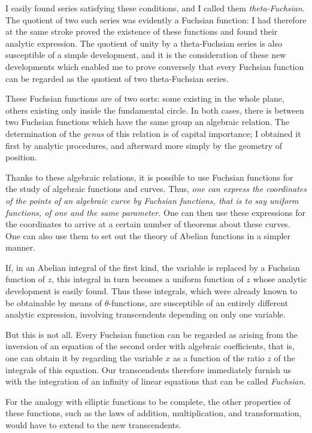 \documentclass[11pt]{article}
\begin{document}
I easily found series satisfying these conditions, and I called them \emph{theta-Fuchsian}. The quotient of two such series was evidently a Fuchsian function: I had therefore at the same stroke proved the existence of these functions and found their analytic expression. The quotient of unity by a theta-Fuchsian series is also susceptible of a simple development, and it is the consideration of these new developments which enabled me to prove conversely that every Fuchsian function can be regarded as the quotient of two theta-Fuchsian series.

These Fuchsian functions are of two sorts: some existing in the whole plane, others existing only inside the fundamental circle. In both cases, there is between two Fuchsian functions which have the same group an algebraic relation. The determination of the \emph{genus} of this relation is of capital importance; I obtained it first by analytic procedures, and afterward more simply by the geometry of position.

Thanks to these algebraic relations, it is possible to use Fuchsian functions for the study of algebraic functions and curves. Thus, \emph{one can express the coordinates of the points of an algebraic curve by Fuchsian functions, that is to say uniform functions, of one and the same parameter.} One can then use these expressions for the coordinates to arrive at a certain number of theorems about these curves. One can also use them to set out the theory of Abelian functions in a simpler manner.

If, in an Abelian integral of the first kind, the variable is replaced by a Fuchsian function of $z$, this integral in turn becomes a uniform function of $z$ whose analytic development is easily found. Thus these integrals, which were already known to be obtainable by means of $\theta$-functions, are susceptible of an entirely different analytic expression, involving transcendents depending on only one variable.

But this is not all. Every Fuchsian function can be regarded as arising from the inversion of an equation of the second order with algebraic coefficients, that is, one can obtain it by regarding the variable $x$ as a function of the ratio $z$ of the integrals of this equation. Our transcendents therefore immediately furnish us with the integration of an infinity of linear equations that can be called \emph{Fuchsian}.

For the analogy with elliptic functions to be complete, the other properties of these functions, such as the laws of addition, multiplication, and transformation, would have to extend to the new transcendents.
\end{document}
